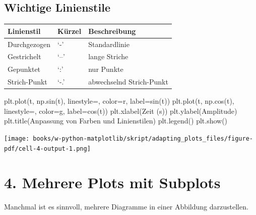\documentclass[
  letterpaper,
  DIV=11,
  numbers=noendperiod]{scrreprt}
\newenvironment{Shaded}{\begin{snugshade}}{\end{snugshade}}
\newcommand{\NormalTok}[1]{\textcolor[rgb]{0.00,0.23,0.31}{#1}}
\newcommand{\OperatorTok}[1]{\textcolor[rgb]{0.37,0.37,0.37}{#1}}
\newcommand{\StringTok}[1]{\textcolor[rgb]{0.13,0.47,0.30}{#1}}
\begin{document}
\subsection{Wichtige Linienstile}\label{wichtige-linienstile}

\begin{longtable}[]{@{}lll@{}}
\toprule\noalign{}
Linienstil & Kürzel & Beschreibung \\
\midrule\noalign{}
\endhead
\bottomrule\noalign{}
\endlastfoot
Durchgezogen & `-' & Standardlinie \\
Gestrichelt & `--' & lange Striche \\
Gepunktet & `:' & nur Punkte \\
Strich-Punkt & `-.' & abwechselnd Strich-Punkt \\
\end{longtable}

\begin{Shaded}
\begin{Highlighting}[]
\NormalTok{plt.plot(t, np.sin(t), linestyle}\OperatorTok{=}\StringTok{\textquotesingle{}{-}\textquotesingle{}}\NormalTok{, color}\OperatorTok{=}\StringTok{\textquotesingle{}r\textquotesingle{}}\NormalTok{, label}\OperatorTok{=}\StringTok{\textquotesingle{}sin(t)\textquotesingle{}}\NormalTok{)}
\NormalTok{plt.plot(t, np.cos(t), linestyle}\OperatorTok{=}\StringTok{\textquotesingle{}{-}{-}\textquotesingle{}}\NormalTok{, color}\OperatorTok{=}\StringTok{\textquotesingle{}g\textquotesingle{}}\NormalTok{, label}\OperatorTok{=}\StringTok{\textquotesingle{}cos(t)\textquotesingle{}}\NormalTok{)}
\NormalTok{plt.xlabel(}\StringTok{\textquotesingle{}Zeit (s)\textquotesingle{}}\NormalTok{)}
\NormalTok{plt.ylabel(}\StringTok{\textquotesingle{}Amplitude\textquotesingle{}}\NormalTok{)}
\NormalTok{plt.title(}\StringTok{\textquotesingle{}Anpassung von Farben und Linienstilen\textquotesingle{}}\NormalTok{)}
\NormalTok{plt.legend()}
\NormalTok{plt.show()}
\end{Highlighting}
\end{Shaded}

\texttt{[image: books/w-python-matplotlib/skript/adapting\_plots\_files/figure-pdf/cell-4-output-1.png]}

\section{4. Mehrere Plots mit
Subplots}\label{mehrere-plots-mit-subplots}

Manchmal ist es sinnvoll, mehrere Diagramme in einer Abbildung
darzustellen.
\end{document}
